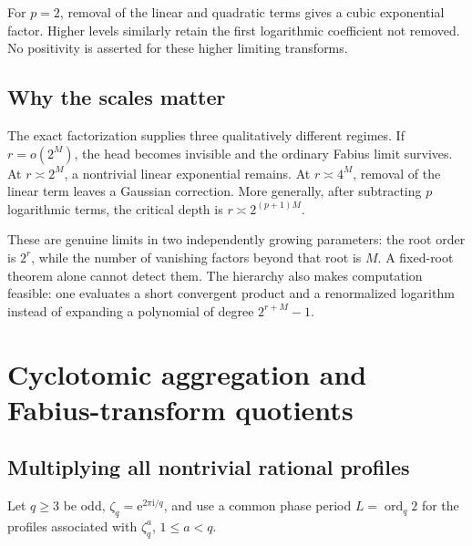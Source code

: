 \documentclass[11pt,a4paper,oneside,openany]{book}
\numberwithin{equation}{chapter}
\theoremstyle{definition}
\theoremstyle{remark}
\newcommand{\e}{\mathrm e}
\newcommand{\ii}{\mathrm i}
\DeclareMathOperator{\ord}{ord}
\begin{document}
For \(p=2\), removal of the linear and quadratic terms gives a cubic exponential factor. Higher levels similarly retain the first logarithmic coefficient not removed. No positivity is asserted for these higher limiting transforms.

\section{Why the scales matter}
The exact factorization supplies three qualitatively different regimes. If \(r=o(2^M)\), the head becomes invisible and the ordinary Fabius limit survives. At \(r\asymp2^M\), a nontrivial linear exponential remains. At \(r\asymp4^M\), removal of the linear term leaves a Gaussian correction. More generally, after subtracting \(p\) logarithmic terms, the critical depth is \(r\asymp2^{(p+1)M}\).

These are genuine limits in two independently growing parameters: the root order is \(2^r\), while the number of vanishing factors beyond that root is \(M\). A fixed-root theorem alone cannot detect them. The hierarchy also makes computation feasible: one evaluates a short convergent product and a renormalized logarithm instead of expanding a polynomial of degree \(2^{r+M}-1\).
\chapter{Cyclotomic aggregation and Fabius-transform quotients}
\label{rr:sec:aggregation}

\section{Multiplying all nontrivial rational profiles}
Let \(q\geq3\) be odd, \(\zeta_q=\e^{2\pi\ii/q}\), and use a common phase period \(L=\ord_q2\) for the profiles associated with \(\zeta_q^a\), \(1\leq a<q\).
\end{document}
